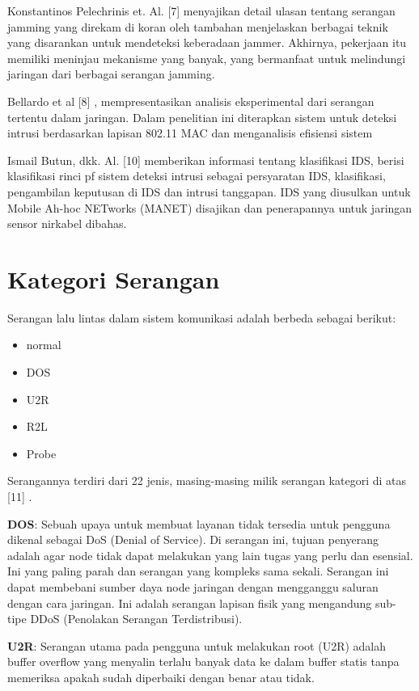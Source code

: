 \documentclass[conference]{IEEEtran}
\begin{document}
    Konstantinos Pelechrinis et. Al. [7] \cite {pelechrinis2010denial} menyajikan detail ulasan tentang serangan jamming yang direkam di koran oleh tambahan menjelaskan berbagai teknik yang disarankan untuk mendeteksi keberadaan jammer. Akhirnya, pekerjaan itu memiliki meninjau mekanisme yang banyak, yang bermanfaat untuk melindungi jaringan dari berbagai serangan jamming.
    
    Bellardo et al [8] \cite {bellardo2003802}, mempresentasikan analisis eksperimental dari serangan tertentu dalam jaringan. Dalam penelitian ini diterapkan sistem untuk deteksi intrusi berdasarkan lapisan 802.11 MAC dan menganalisis efisiensi sistem
    
    Ismail Butun, dkk. Al. [10] \cite {zhang2000intrusion} memberikan informasi tentang klasifikasi IDS, berisi klasifikasi rinci pf sistem deteksi intrusi sebagai persyaratan IDS, klasifikasi, pengambilan keputusan di IDS dan intrusi tanggapan. IDS yang diusulkan untuk Mobile Ah-hoc NETworks (MANET) disajikan dan penerapannya untuk jaringan sensor nirkabel dibahas.
    
\section{Kategori Serangan}
Serangan lalu lintas dalam sistem komunikasi adalah
berbeda sebagai berikut:

\begin{itemize}
    \item normal
    \item DOS
    \item U2R
    \item R2L
    \item Probe
\end{itemize}

Serangannya terdiri dari 22 jenis, masing-masing milik serangan
kategori di atas [11] \cite {butun2013survey}.

\textbf{DOS}: Sebuah upaya untuk membuat layanan
tidak tersedia untuk pengguna dikenal sebagai DoS (Denial of Service). Di
serangan ini, tujuan penyerang adalah agar node tidak dapat melakukan yang lain
tugas yang perlu dan esensial. Ini yang paling parah dan
serangan yang kompleks sama sekali. Serangan ini dapat membebani sumber daya
node jaringan dengan mengganggu saluran dengan cara jaringan.
Ini adalah serangan lapisan fisik yang mengandung sub-tipe DDoS
(Penolakan Serangan Terdistribusi).

\textbf{U2R}: Serangan utama pada pengguna untuk melakukan root
(U2R) adalah buffer overflow yang menyalin terlalu banyak data ke dalam
buffer statis tanpa memeriksa apakah sudah diperbaiki dengan benar atau tidak.
\end{document}
